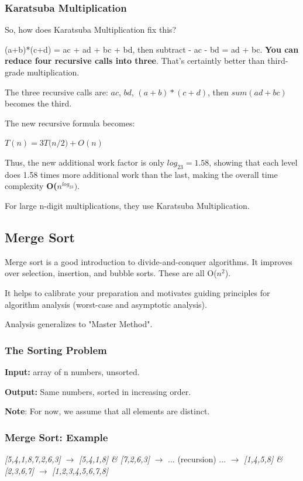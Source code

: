 \documentclass[11pt]{article}
\newenvironment{aside}
  {\begin{mdframed}[style=0,%
      leftline=false,rightline=false,leftmargin=2em,rightmargin=2em,%
          innerleftmargin=0pt,innerrightmargin=0pt,linewidth=0.75pt,%
      skipabove=7pt,skipbelow=7pt]\small}
  {\end{mdframed}}
\begin{document}
\subsubsection{Karatsuba Multiplication}

So, how does Karatsuba Multiplication fix this?

(a+b)*(c+d) = ac + ad + bc + bd, then subtract - ac - bd = ad + bc. \textbf{You can reduce four recursive calls into three}. That's certaintly better than third-grade multiplication.

The three recursive calls are: $ac$, $bd$, $(a+b) * (c+d)$, then $sum(ad + bc)$ becomes the third.

The new recursive formula becomes:

$T(n) = 3T({n/2) + O(n)}$

Thus, the new additional work factor is only \(log_23 = 1.58\), showing that each level does 1.58 times more additional work than the last, making the overall time complexity \textbf{O(\(n^{log_23})\)}.

For large n-digit multiplications, they use Karatsuba Multiplication.

\vspace{11pt}
\subsection{Merge Sort}

Merge sort is a good introduction to divide-and-conquer algorithms. It improves over selection, insertion, and bubble sorts. These are all O(\(n^2\)).

It helps to calibrate your preparation and motivates guiding principles for algorithm analysis (worst-case and asymptotic analysis).

Analysis generalizes to "Master Method".

\subsubsection{The Sorting Problem}

\textbf{Input:} array of n numbers, unsorted.

\textbf{Output:} Same numbers, sorted in increasing order.
\vspace{11pt}
\begin{aside}
    \textbf{Note}: For now, we assume that all elements are distinct.
\end{aside}
\vspace{11pt}
\subsubsection{Merge Sort: Example}
\vspace{11pt}
\textit{[5,4,1,8,7,2,6,3]} $\to$ \textit{[5,4,1,8] \& [7,2,6,3]} $\to$ ... (recursion) ... $\to$ \textit{[1,4,5,8] \& [2,3,6,7]} $\to$ \textit{[1,2,3,4,5,6,7,8]}
\end{document}
